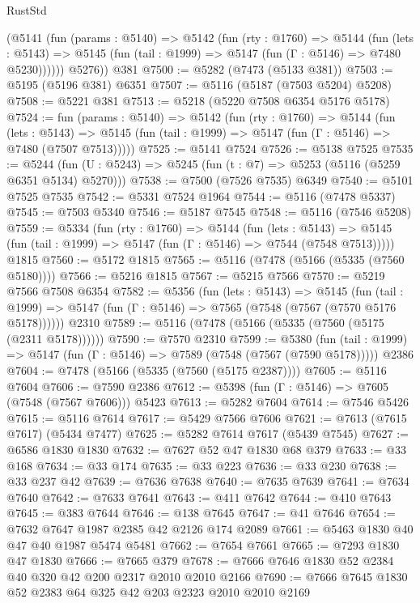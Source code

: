 \begin{lexlean}{RustStd}
\begin{coremodule}
{\begin{coremodule}
{{{{{{{{{{{{{{{{{{{{{{{{{{{{{{{        (@5141
          (fun (params : @5140) =>
          @5142
            (fun (rty : @1760) =>
            @5144
              (fun (lets : @5143) =>
              @5145 (fun (tail : @1999) => @5147 (fun (Γ : @5146) => @7480 @5230))))))
        @5276))
    @381
@7500 := @5282 (@7473 (@5133 @381))
@7503 := @5195 (@5196 @381) @6351
@7507 := @5116 (@5187 (@7503 @5204) @5208)
@7508 := @5221 @381
@7513 := @5218 (@5220 @7508 @6354 @5176 @5178)
@7524 := fun (params : @5140) =>
  @5142
    (fun (rty : @1760) =>
    @5144
      (fun (lets : @5143) =>
      @5145 (fun (tail : @1999) => @5147 (fun (Γ : @5146) => @7480 (@7507 @7513)))))
@7525 := @5141 @7524
@7526 := @5138 @7525
@7535 := @5244 (fun (U : @5243) => @5245 (fun (t : @7) => @5253 (@5116 (@5259 @6351 @5134) @5270)))
@7538 := @7500 (@7526 @7535) @6349
@7540 := @5101 @7525 @7535
@7542 := @5331 @7524 @1964
@7544 := @5116 (@7478 @5337)
@7545 := @7503 @5340
@7546 := @5187 @7545
@7548 := @5116 (@7546 @5208)
@7559 := @5334
    (fun (rty : @1760) =>
    @5144
      (fun (lets : @5143) =>
      @5145 (fun (tail : @1999) => @5147 (fun (Γ : @5146) => @7544 (@7548 @7513)))))
    @1815
@7560 := @5172 @1815
@7565 := @5116 (@7478 (@5166 (@5335 (@7560 @5180))))
@7566 := @5216 @1815
@7567 := @5215 @7566
@7570 := @5219 @7566 @7508 @6354
@7582 := @5356
    (fun (lets : @5143) =>
    @5145
      (fun (tail : @1999) => @5147 (fun (Γ : @5146) => @7565 (@7548 (@7567 (@7570 @5176 @5178))))))
    @2310
@7589 := @5116 (@7478 (@5166 (@5335 (@7560 (@5175 (@2311 @5178))))))
@7590 := @7570 @2310
@7599 := @5380
    (fun (tail : @1999) => @5147 (fun (Γ : @5146) => @7589 (@7548 (@7567 (@7590 @5178)))))
    @2386
@7604 := @7478 (@5166 (@5335 (@7560 (@5175 @2387))))
@7605 := @5116 @7604
@7606 := @7590 @2386
@7612 := @5398 (fun (Γ : @5146) => @7605 (@7548 (@7567 @7606))) @5423
@7613 := @5282 @7604
@7614 := @7546 @5426
@7615 := @5116 @7614
@7617 := @5429 @7566 @7606
@7621 := @7613 (@7615 @7617) (@5434 @7477)
@7625 := @5282 @7614 @7617 (@5439 @7545)
@7627 := @6586 @1830 @1830
@7632 := @7627 @52 @47 @1830 @68 @379
@7633 := @33 @168
@7634 := @33 @174
@7635 := @33 @223
@7636 := @33 @230
@7638 := @33 @237 @42
@7639 := @7636 @7638
@7640 := @7635 @7639
@7641 := @7634 @7640
@7642 := @7633 @7641
@7643 := @411 @7642
@7644 := @410 @7643
@7645 := @383 @7644
@7646 := @138 @7645
@7647 := @41 @7646
@7654 := @7632 @7647 @1987 @2385 @42 @2126 @174 @2089
@7661 := @5463 @1830 @40 @47 @40 @1987 @5474 @5481
@7662 := @7654 @7661
@7665 := @7293 @1830 @47 @1830
@7666 := @7665 @379
@7678 := @7666 @7646 @1830 @52 @2384 @40 @320 @42 @200 @2317 @2010 @2010 @2166
@7690 := @7666 @7645 @1830 @52 @2383 @64 @325 @42 @203 @2323 @2010 @2010 @2169
}}}}}}}}}}}}}}}}}}}}}}}}}}}}}}}
\end{coremodule}}
\end{coremodule}
\end{lexlean}
